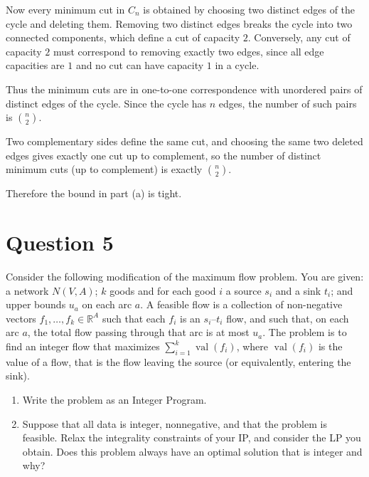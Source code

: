 \documentclass[letterpaper]{article}
\begin{document}
\begin{enumerate}
		Now every minimum cut in $C_n$ is obtained by choosing two distinct edges of
		the cycle and deleting them. Removing two distinct edges breaks the cycle into
		two connected components, which define a cut of capacity $2$. Conversely, any
		cut of capacity $2$ must correspond to removing exactly two edges, since all
		edge capacities are $1$ and no cut can have capacity $1$ in a cycle.
		
		Thus the minimum cuts are in one-to-one correspondence with unordered pairs of
		distinct edges of the cycle. Since the cycle has $n$ edges, the number of such
		pairs is
		$
		\binom{n}{2}.
		$
		
		Two complementary sides define the same cut, and choosing the same two deleted
		edges gives exactly one cut up to complement, so the number of distinct minimum
		cuts (up to complement) is exactly
		$
		\binom{n}{2}.
		$
		
		Therefore the bound in part (a) is tight.
	\end{enumerate}
	
		\clearpage
		
		\section{Question 5}
		Consider the following modification of the maximum flow problem. You are given:
		a network $N(V,A)$; $k$ goods and for each good $i$ a source $s_i$ and a sink
		$t_i$; and upper bounds $u_a$ on each arc $a$. A feasible flow is a collection
		of non-negative vectors $f_1,\ldots,f_k \in \mathbb{R}^A$ such that each $f_i$
		is an $s_i$--$t_i$ flow, and such that, on each arc $a$, the total flow passing
		through that arc is at most $u_a$. The problem is to find an integer flow that
		maximizes $\sum_{i=1}^k \operatorname{val}(f_i)$, where $\operatorname{val}(f_i)$
		is the value of a flow, that is the flow leaving the source (or equivalently,
		entering the sink).
		
		\begin{enumerate}
			\item[(a)] Write the problem as an Integer Program.
			
			\item[(b)] Suppose that all data is integer, nonnegative, and that the problem is
			feasible. Relax the integrality constraints of your IP, and consider the LP you
			obtain. Does this problem always have an optimal solution that is integer and why?
		\end{enumerate}
	
\end{document}

